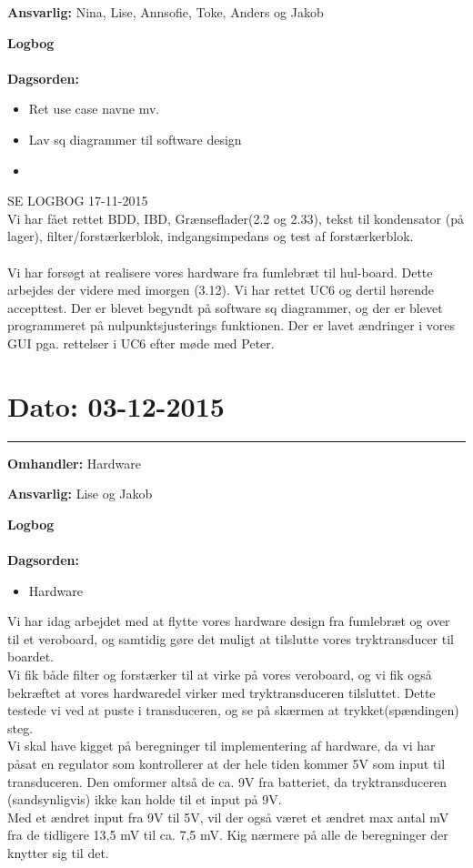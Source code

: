 \textbf{Ansvarlig:} Nina, Lise, Annsofie, Toke, Anders og Jakob

\textbf{Logbog}
\\
\\
\textbf{Dagsorden:}
\begin{itemize}
	\item Ret use case navne mv.
	\item Lav sq diagrammer til software design
	\item 
\end{itemize}

SE LOGBOG 17-11-2015 \\
Vi har fået rettet BDD, IBD, Grænseflader(2.2 og 2.33), tekst til kondensator (på lager), filter/forstærkerblok, indgangsimpedans og test af forstærkerblok.
\\
\\
Vi har forsøgt at realisere vores hardware fra fumlebræt til hul-board. Dette arbejdes der videre med imorgen (3.12).
Vi har rettet UC6 og dertil hørende accepttest. 
Der er blevet begyndt på software sq diagrammer, og der er blevet programmeret på nulpunktsjusterings funktionen. 
Der er lavet ændringer i vores GUI pga. rettelser i UC6 efter møde med Peter.
	
	
	
	
\section{Dato: 03-12-2015 }
\hrule

\textbf{Omhandler:} Hardware

\textbf{Ansvarlig:} Lise og Jakob

\textbf{Logbog}
\\
\\
\textbf{Dagsorden:}
\begin{itemize}
	\item Hardware
\end{itemize}

Vi har idag arbejdet med at flytte vores hardware design fra fumlebræt og over til et veroboard, og samtidig gøre det muligt at tilslutte vores tryktransducer til boardet.\\ 
Vi fik både filter og forstærker til at virke på vores veroboard, og vi fik også bekræftet at vores hardwaredel virker med tryktransduceren tilsluttet. Dette testede vi ved at puste i transduceren, og se på skærmen at trykket(spændingen) steg.	\\
Vi skal have kigget på beregninger til implementering af hardware, da vi har påsat en regulator som kontrollerer at der hele tiden kommer 5V som input til transduceren. Den omformer altså de ca. 9V fra batteriet, da tryktransduceren (sandsynligvis) ikke kan holde til et input på 9V.\\
Med et ændret input fra 9V til 5V, vil der også været et ændret max antal mV fra de tidligere 13,5 mV til ca. 7,5 mV. Kig nærmere på alle de beregninger der knytter sig til det.



